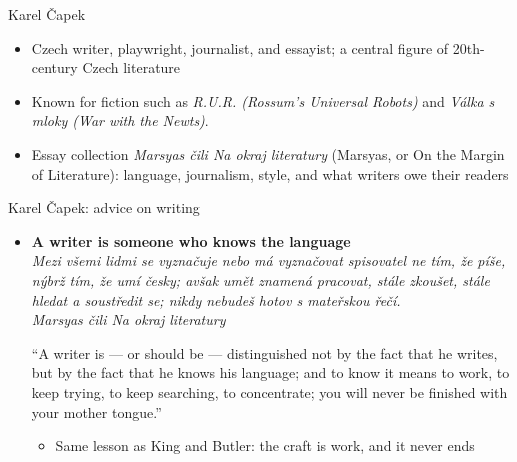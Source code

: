 \documentclass[aspectratio=169]{beamer}
\begin{document}
\begin{frame}{Karel \v{C}apek}
  \begin{itemize}
    \item Czech writer, playwright, journalist, and essayist; a central figure of 20th-century Czech literature
    \item Known for fiction such as \emph{R.U.R. (Rossum's Universal Robots)}
          and \emph{Válka s mloky (War with the Newts)}.
    \item Essay collection \emph{Marsyas čili Na okraj literatury} (Marsyas, or On
          the Margin of Literature): language, journalism, style, and what
          writers owe their readers
  \end{itemize}
\end{frame}
\begin{frame}{Karel \v{C}apek: advice on writing}
  \begin{itemize}
    \item \textbf{A writer is someone who knows the language}\\[0.6em]
      \emph{Mezi všemi lidmi se vyznačuje nebo má vyznačovat spisovatel ne
      tím, že píše, nýbrž tím, že umí česky; avšak umět znamená pracovat,
      stále zkoušet, stále hledat a soustředit se; nikdy nebudeš hotov
      s mateřskou řečí.} \\
      \emph{Marsyas čili Na okraj literatury} \citep[pp~176–177]{capek:marsyas}

      \vspace{0.4em}
      ``A writer is --- or should be --- distinguished not by the fact that he writes,
      but by the fact that he knows his language; and to know it means to work,
      to keep trying, to keep searching, to concentrate; you will never be finished
      with your mother tongue.''

      \vspace{0.8em}
      \begin{itemize}
        \item Same lesson as King and Butler: the craft is work, and it never ends
      \end{itemize}
  \end{itemize}
\end{frame}
\end{document}
